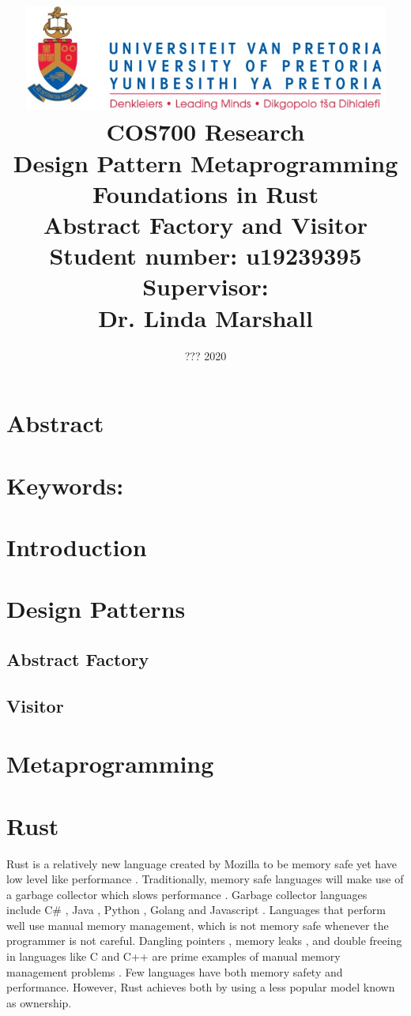 \documentclass[a4paper,10pt]{article}
\title
{
   \includegraphics[width=12cm]{up_logo.png} \\
   \vspace{2cm}
   \textbf{COS700 Research} \\ \vspace{0.5cm}
   \textbf{Design Pattern Metaprogramming Foundations in Rust\\ \large Abstract Factory and Visitor} \\ \vspace{0.5cm}
   \textbf{Student number:} u19239395 \\ \vspace{0.5cm}
   \textbf{Supervisor}: \\ Dr. Linda Marshall
}
\date{??? 2020}
\begin{document}
\author{}

\maketitle

\newpage
\linespread{1.25}

\section*{Abstract}

\section*{Keywords:}

\newpage

\section{Introduction}

\section{Design Patterns}

\subsection{Abstract Factory}

\subsection{Visitor}

\section{Metaprogramming}

\section{Rust}
Rust is a relatively new language created by Mozilla to be memory safe yet have low level like performance \cite{klabnik_2019_01}.
Traditionally, memory safe languages will make use of a garbage collector which slows performance \cite{hertz_05_01}.
Garbage collector languages include C\# \cite{robinson_04_01}, Java \cite{gosling_96_01}, Python \cite{martelli_06_01}, Golang \cite{tsoukalos_18_01} and Javascript \cite{flanagan_06_01}.
Languages that perform well use manual memory management, which is not memory safe whenever the programmer is not careful.
Dangling pointers \cite{caballero_12_01}, memory leaks \cite{wilson_92_01}, and double freeing \cite{sharp_13_01} in languages like C and C++ are prime examples of manual memory management problems \cite{konrad_18_01}.
Few languages have both memory safety and performance.
However, Rust achieves both by using a less popular model known as ownership.
\end{document}
